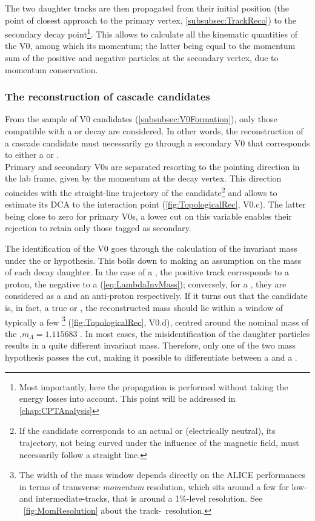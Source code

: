 The two daughter tracks are then propagated from their initial position (the point of closest approach to the primary vertex, \Sec\ref{subsubsec:TrackReco}) to the secondary decay point\footnote{Most importantly, here the propagation is performed without taking the energy losses into account. This point will be addressed in \chap\ref{chap:CPTAnalysis}\label{footnote:EnergyLossV0CascVertexing}}. This allows to calculate all the kinematic quantities of the V0, among which its momentum; the latter being equal to the momentum sum of the positive and negative particles at the secondary vertex, due to momentum conservation.

\subsubsection{The reconstruction of cascade candidates}
\label{subsubsec:CascadeFormation}

From the sample of V0 candidates (\Sec\ref{subsubsec:V0Formation}), only those compatible with a \rmXiPM or \rmOmegaPM decay are considered. In other words, the reconstruction of a cascade candidate must necessarily go through a secondary V0 that corresponds to either a \rmLambda or \rmAlambda.\\

Primary and secondary V0s are separated resorting to the pointing direction in the lab frame, given by the momentum at the decay vertex. This direction coincides with the straight-line trajectory of the candidate\footnote{If the candidate corresponds to an actual \rmLambda or \rmAlambda (electrically neutral), its trajectory, not being curved under the influence of the magnetic field, must necessarily follow a straight line.} and allows to estimate its DCA to the interaction point (\fig\ref{fig:TopologicalRec}, V0.c). The latter being close to zero for primary V0s, a lower cut on this variable enables their rejection to retain only those tagged as secondary. 

The identification of the V0 goes through the calculation of the invariant mass under  the \rmLambda or \rmAlambda hypothesis. This boils down to making an assumption on the mass of each decay daughter. In the case of a \rmLambda, the positive track corresponds to a proton, the negative to a \piMinus (\eq\ref{eq:LambdaInvMass}); conversely, for a \rmAlambda, they are considered as a \piPlus and an anti-proton respectively. If it turns out that the candidate is, in fact, a true \rmLambda or \rmAlambda, the reconstructed mass should lie within a window of typically a few \mmass\footnote{The width of the mass window depends directly on the ALICE performances in terms of transverse \emph{momentum} resolution, which sits around a few \mmom for low- and intermediate-\pT tracks, that is around a 1\%-level resolution. See \fig~\ref{fig:MomResolution} about the track-\pT\ resolution.} (\fig\ref{fig:TopologicalRec}, V0.d), centred around the nominal mass of the \rmLambda,\break $m_{\Lambda} = 1.115683$ \gmass. In most cases, the misidentification of the daughter particles results in a quite different invariant mass. Therefore, only one of the two mass hypothesis passes the cut, making it possible to differentiate between a \rmLambda and a \rmAlambda.

